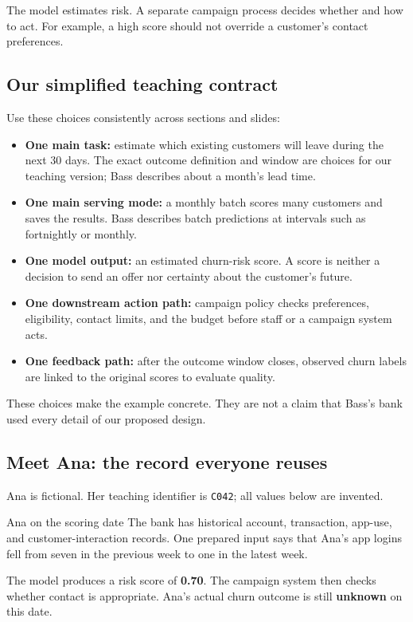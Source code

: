 \documentclass[12pt,a4paper]{article}
\begin{document}
The model estimates risk. A separate campaign process decides whether and how to act. For example, a high score should not override a customer's contact preferences.

\subsection{Our simplified teaching contract}
Use these choices consistently across sections and slides:
\begin{itemize}
\item \textbf{One main task:} estimate which existing customers will leave during the next 30 days. The exact outcome definition and window are choices for our teaching version; Bass describes about a month's lead time.
\item \textbf{One main serving mode:} a monthly batch scores many customers and saves the results. Bass describes batch predictions at intervals such as fortnightly or monthly.
\item \textbf{One model output:} an estimated churn-risk score. A score is neither a decision to send an offer nor certainty about the customer's future.
\item \textbf{One downstream action path:} campaign policy checks preferences, eligibility, contact limits, and the budget before staff or a campaign system acts.
\item \textbf{One feedback path:} after the outcome window closes, observed churn labels are linked to the original scores to evaluate quality.
\end{itemize}

These choices make the example concrete. They are not a claim that Bass's bank used every detail of our proposed design.

\subsection{Meet Ana: the record everyone reuses}
Ana is fictional. Her teaching identifier is \texttt{C042}; all values below are invented.

\begin{examplebox}{Ana on the scoring date}
The bank has historical account, transaction, app-use, and customer-interaction records. One prepared input says that Ana's app logins fell from seven in the previous week to one in the latest week.

The model produces a risk score of \textbf{0.70}. The campaign system then checks whether contact is appropriate. Ana's actual churn outcome is still \textbf{unknown} on this date.
\end{examplebox}
\end{document}
